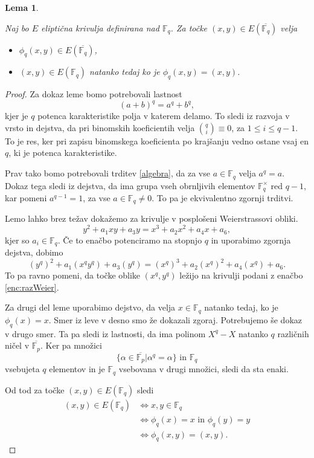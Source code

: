 \documentclass[12pt,a4paper,twoside]{article}
\theoremstyle{definition} %
\theoremstyle{plain} %
\newtheorem{lema}[definicija]{Lema}
\numberwithin{equation}{section}  %
\newcommand{\F}{\mathbb F}
\newcommand{\Fq}[1]{{\mathbb{F}_{#1}}}
\newcommand{\E}[1]{E({#1})}
\begin{document}
\begin{lema}
\label{lema:4.5}

Naj bo $E$ eliptična krivulja definirana nad $\F_q$. Za točke $(x,y) \in \E{\overline{\F_q}}$ velja
\begin{itemize}

\item $\phi_q(x,y) \in \E{\overline{\F_q}}$,
\item $(x,y) \in \E{\F_q}$ natanko tedaj ko je $\phi_q(x,y) = (x,y)$.


\end{itemize}

\end{lema}

\begin{proof}
Za dokaz leme bomo potrebovali lastnost $$(a+b)^q = a^q+b^q,$$ kjer je $q$ potenca karakteristike polja v katerem delamo. To sledi iz razvoja v vrsto in dejstva, da pri binomskih koeficientih velja
${q\choose i} \equiv 0$, za $1 \leq i \leq q-1$. To je res, ker pri zapisu binomskega koeficienta po krajšanju vedno ostane vsaj en $q$, ki je potenca karakteristike. 

Prav tako bomo potrebovali trditev \ref{algebra}, da za vse $a \in \F_q$ velja $a^q = a$. Dokaz tega sledi iz dejstva, da ima grupa vseh obrnljivih elementov $\F^{\times}_q$ red $q-1$, kar pomeni $a^{q-1} = 1$, za vse $a \in \F_q \neq 0$. To pa je ekvivalentno zgornji trditvi.

Lemo lahko brez težav dokažemo za krivulje v posplošeni Weierstrassovi obliki.
\begin{equation}
\label{enc:razWeier}
y^2+a_1xy+a_3y=x^3+a_2x^2+a_4x+a_6,
\end{equation}
kjer so $a_i \in \F_q$. Če to enačbo potenciramo na stopnjo $q$ in uporabimo zgornja dejstva, dobimo
$$(y^q)^2+a_1(x^qy^q)+a_3(y^q)=(x^q)^3+a_2(x^q)^2+a_4(x^q)+a_6.$$
To pa ravno pomeni, da točke oblike $(x^q,y^q)$ ležijo na krivulji podani z enačbo \ref{enc:razWeier}.

Za drugi del leme uporabimo dejstvo, da velja $x \in \F_q$ natanko tedaj, ko je $\phi_q(x) = x$. Smer iz leve v desno smo že dokazali zgoraj. Potrebujemo še dokaz v drugo smer. Ta pa sledi iz lastnosti, da ima polinom $X^q-X$ natanko $q$ različnih ničel v $\overline{\F_p}$. Ker pa množici
$$\{ \alpha \in \overline{\F_p} | \alpha^q = \alpha \} \text{ in } \F_q$$
vsebujeta $q$ elementov in je $\F_q$ vsebovana v drugi množici, sledi da sta enaki.

Od tod za točke $(x,y) \in \E{\Fq{q}}$ sledi
\begin{align}
(x,y) \in E(\F_q) &{}\Leftrightarrow x,y \in \F_q \nonumber \\
&{}  \Leftrightarrow \phi_q(x) = x \text{ in } \phi_q(y) = y  \nonumber \\
&{} \Leftrightarrow \phi_q(x,y) = (x,y). \nonumber
\end{align} 

\end{proof}
\end{document}
